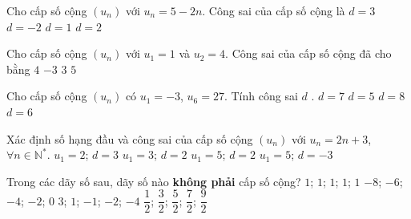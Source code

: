 \begin{ex}%
	Cho cấp số cộng  $(u_n)$ với $u_n=5-2 n$. Công sai của cấp số cộng là
	\choice 
		{$d=3$} 
		 {\True $d=-2$}
		{$d=1$} 
		 {$d=2$}
\end{ex}

\begin{ex}%
	Cho cấp số cộng $(u_n)$ với $u_1=1$  và $u_2=4$. Công sai của cấp số cộng đã cho bằng
	 \choice
		 {$4$}
		{$-3$} 
		{\True  $3$}
		 {$5$}
\end{ex}

\begin{ex}%
	Cho cấp số cộng $\left(u_n\right)$ có $u_1=-3$,  $u_6=27$. Tính công sai $d$ .
	\choice 
		 {$d=7$}
		{$d=5$} 
		 {$d=8$}
		 {\True $d=6$}
\end{ex}

\begin{ex}%
	Xác định số hạng đầu và công  sai của cấp số cộng $(u_n)$ với $u_n=2n+3$, $\forall n \in \mathbb{N}^*$.
	 \choice
		{$u_1=2$;  $d=3$}
		{$u_1=3$;  $d=2$}
		{\True $u_1=5$;  $d=2$}
		{$u_1=5$; $d=-3$} 
\end{ex}

\begin{ex}%
	Trong các dãy số sau, dãy số nào \textbf{không phải} cấp  số cộng?
	\choice 
		{$1$;  $1$; $1$; $1$; $1$}
		{$-8$;  $-6$; $-4$; $-2$; $0$}
		{\True $3$; $1$; $-1$; $-2$; $-4$} 
		{$\dfrac{1}{2}$; $\dfrac{3}{2}$; $\dfrac{5}{2}$; $\dfrac{7}{2}$; $\dfrac{9}{2}$} 
\end{ex}

